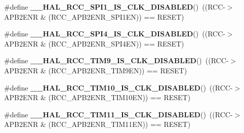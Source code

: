 \begin{DoxyCompactItemize}
\item 
\mbox{\label{group___r_c_c_ex___peripheral___clock___enable___disable___status_gabd506be27916f029d2214e88bc48f6df}} 
\#define {\bfseries \+\_\+\+\_\+\+H\+A\+L\+\_\+\+R\+C\+C\+\_\+\+S\+P\+I1\+\_\+\+I\+S\+\_\+\+C\+L\+K\+\_\+\+D\+I\+S\+A\+B\+L\+ED}()~((R\+CC-\/$>$A\+P\+B2\+E\+NR \& (R\+C\+C\+\_\+\+A\+P\+B2\+E\+N\+R\+\_\+\+S\+P\+I1\+EN)) == R\+E\+S\+ET)
\item 
\mbox{\label{group___r_c_c_ex___peripheral___clock___enable___disable___status_gac16a7c0d1778ba7cee83c45143f81c9b}} 
\#define {\bfseries \+\_\+\+\_\+\+H\+A\+L\+\_\+\+R\+C\+C\+\_\+\+S\+P\+I4\+\_\+\+I\+S\+\_\+\+C\+L\+K\+\_\+\+D\+I\+S\+A\+B\+L\+ED}()~((R\+CC-\/$>$A\+P\+B2\+E\+NR \& (R\+C\+C\+\_\+\+A\+P\+B2\+E\+N\+R\+\_\+\+S\+P\+I4\+EN)) == R\+E\+S\+ET)
\item 
\mbox{\label{group___r_c_c_ex___peripheral___clock___enable___disable___status_ga83b7ae4eea41d7c7914716157b4072f4}} 
\#define {\bfseries \+\_\+\+\_\+\+H\+A\+L\+\_\+\+R\+C\+C\+\_\+\+T\+I\+M9\+\_\+\+I\+S\+\_\+\+C\+L\+K\+\_\+\+D\+I\+S\+A\+B\+L\+ED}()~((R\+CC-\/$>$A\+P\+B2\+E\+NR \& (R\+C\+C\+\_\+\+A\+P\+B2\+E\+N\+R\+\_\+\+T\+I\+M9\+EN)) == R\+E\+S\+ET)
\item 
\mbox{\label{group___r_c_c_ex___peripheral___clock___enable___disable___status_gaf9ec8a421c88ea172a5f3cb13c220672}} 
\#define {\bfseries \+\_\+\+\_\+\+H\+A\+L\+\_\+\+R\+C\+C\+\_\+\+T\+I\+M10\+\_\+\+I\+S\+\_\+\+C\+L\+K\+\_\+\+D\+I\+S\+A\+B\+L\+ED}()~((R\+CC-\/$>$A\+P\+B2\+E\+NR \& (R\+C\+C\+\_\+\+A\+P\+B2\+E\+N\+R\+\_\+\+T\+I\+M10\+EN)) == R\+E\+S\+ET)
\item 
\mbox{\label{group___r_c_c_ex___peripheral___clock___enable___disable___status_gacee7220c840db84ec10d0b89ab20fa1e}} 
\#define {\bfseries \+\_\+\+\_\+\+H\+A\+L\+\_\+\+R\+C\+C\+\_\+\+T\+I\+M11\+\_\+\+I\+S\+\_\+\+C\+L\+K\+\_\+\+D\+I\+S\+A\+B\+L\+ED}()~((R\+CC-\/$>$A\+P\+B2\+E\+NR \& (R\+C\+C\+\_\+\+A\+P\+B2\+E\+N\+R\+\_\+\+T\+I\+M11\+EN)) == R\+E\+S\+ET)
\item 

\end{DoxyCompactItemize}
